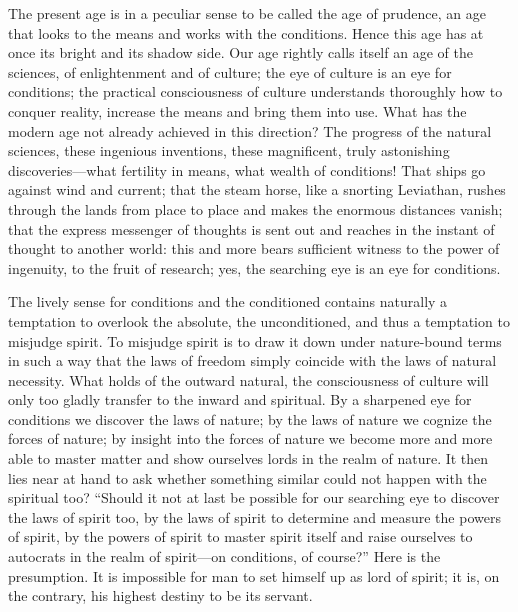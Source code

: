 \documentclass[12pt]{book}
\newcommand{\opage}[1]{\marginnote{\footnotesize\textit{[#1]}}}
\begin{document}
The present age is in a peculiar sense to be called the age of
prudence, an age that looks to the means and works with the conditions.
Hence this age has at once its bright and its shadow side. Our age
rightly calls itself an age of the sciences, of enlightenment and of
culture; the eye of culture is an eye for conditions; the practical
consciousness of culture understands thoroughly how to conquer reality,
increase the means and bring them into use. What has the modern age not
already achieved in this direction? The progress of the natural
sciences, these ingenious inventions, these magnificent, truly
astonishing discoveries---what fertility in means, what wealth of
conditions! That ships go against wind and current; that the steam
horse, like a snorting Leviathan, rushes through the lands from place to
place and makes the enormous distances vanish; that the express
messenger of thoughts is sent out
\opage{4}\setcounter{footnote}{0}%
and reaches in the instant of thought to another world: this and more
bears sufficient witness to the power of ingenuity, to the fruit of
research; yes, the searching eye is an eye for conditions.

The lively sense for conditions and the conditioned contains naturally a
temptation to overlook the absolute, the unconditioned, and thus a
temptation to misjudge spirit. To misjudge spirit is to draw it down
under nature-bound terms in such a way that the laws of freedom simply
coincide with the laws of natural necessity. What holds of the outward
natural, the consciousness of culture will only too gladly transfer to
the inward and spiritual. By a sharpened eye for conditions we discover
the laws of nature; by the laws of nature we cognize the forces of
nature; by insight into the forces of nature we become more and more
able to master matter and show ourselves lords in the realm of nature.
It then lies near at hand to ask whether something similar could not
happen with the spiritual too? ``Should it not at last be possible for
our searching eye to discover the laws of spirit too, by the laws of
spirit to determine and measure the powers of spirit, by the powers of
spirit to master spirit itself and raise ourselves to autocrats in the
realm of spirit---on conditions, of course?'' Here is the presumption.
It is impossible for man to set himself up as lord of spirit; it is, on
the contrary, his highest destiny to be its servant.
\end{document}
